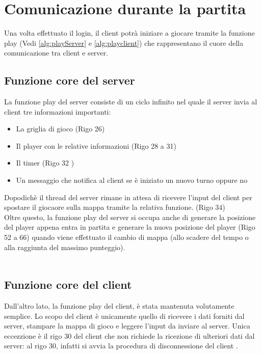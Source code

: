 \documentclass[a4paper]{article}
\begin{document}
\section{Comunicazione durante la partita}
Una volta effettuato il login, il client potrà iniziare a giocare tramite la funzione play (Vedi \autoref{alg:playServer} e \autoref{alg:playclient})
che rappresentano il cuore della comunicazione tra client e server.\\
\subsection{Funzione core del server}
La funzione play del server consiste di un ciclo infinito nel quale il server invia al client tre informazioni importanti:
\begin{itemize}
  \setlength\itemsep{0.2mm}
  \item La griglia di gioco (Rigo 26)
  \item Il player con le relative informazioni (Rigo 28 a 31)
  \item Il timer (Rigo 32 )
  \item Un messaggio che notifica al client se è iniziato un nuovo turno oppure no
\end{itemize}
Dopodichè il thread del server rimane in attesa di ricevere l'input del client per spostare il giocaore sulla mappa tramite la relativa funzione. (Rigo 34)
\\Oltre questo, la funzione play del server si occupa anche di generare la posizione del player appena entra in partita e generare la nuova posizione del player (Rigo 52 a 66) quando viene effettuato il cambio di mappa (allo scadere del tempo o alla raggiunta del massimo punteggio).
\\
\\
\subsection{Funzione core del client}
Dall'altro lato, la funzione play del client, è stata mantenuta volutamente semplice.
Lo scopo del client è unicamente quello di ricevere i dati forniti dal server, stampare la mappa di gioco e leggere l'input da inviare al server.
Unica eccezzione è il rigo 30  del client che non richiede la ricezione di ulteriori dati dal server: al rigo 30, infatti si avvia la procedura di disconnessione del client .
\pagebreak

\end{document}

